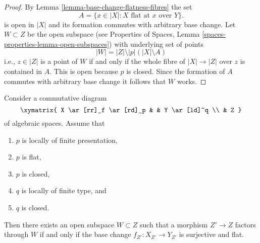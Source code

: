 \begin{proof}
By Lemma \ref{lemma-base-change-flatness-fibres}
the set
$$
A = \{x \in |X| : X\text{ flat at }x \text{ over }Y\}.
$$
is open in $|X|$ and its formation commutes with arbitrary base
change. Let $W \subset Z$ be the open subspace
(see
Properties of Spaces, Lemma
\ref{spaces-properties-lemma-open-subspaces})
with underlying set of points
$$
|W| = |Z| \setminus |p|\left(|X| \setminus A\right)
$$
i.e., $z \in |Z|$ is a point of $W$ if and only if the whole fibre
of $|X| \to |Z|$ over $z$ is contained in $A$. This is open because
$p$ is closed. Since the formation of $A$ commutes with arbitrary
base change it follows that $W$ works.
\end{proof}

\begin{lemma}
\label{lemma-where-surjective-flat}
Consider a commutative diagram
$$
\xymatrix{
X \ar[rr]_f \ar[rd]_p & & Y \ar[ld]^q \\
& Z
}
$$
of algebraic spaces. Assume that
\begin{enumerate}
\item $p$ is locally of finite presentation,
\item $p$ is flat,
\item $p$ is closed,
\item $q$ is locally of finite type, and
\item $q$ is closed.
\end{enumerate}
Then there exists an open subspace $W \subset Z$
such that a morphism $Z' \to Z$ factors through $W$ if and only if the
base change $f_{Z'} : X_{Z'} \to Y_{Z'}$ is surjective and flat.
\end{lemma}

